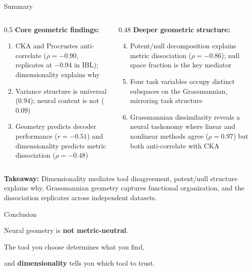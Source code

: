 \documentclass[aspectratio=169,11pt]{beamer}
\begin{document}
\begin{frame}{Summary}
\begin{columns}[T]
\begin{column}{0.5\textwidth}
\textbf{Core geometric findings:}
\begin{enumerate}
  \item CKA and Procrustes anti-correlate ($\rho = -0.90$, replicates at $-0.94$ in IBL); dimensionality explains why
  \item Variance structure is universal ($0.94$); neural content is not ($0.09$)
  \item Geometry predicts decoder performance ($r = -0.51$) and dimensionality predicts metric dissociation ($\rho = -0.48$)
\end{enumerate}
\end{column}
\begin{column}{0.48\textwidth}
\textbf{Deeper geometric structure:}
\begin{enumerate}
  \setcounter{enumi}{3}
  \item Potent/null decomposition explains metric dissociation ($\rho = -0.86$); null space fraction is the key mediator
  \item Four task variables occupy distinct subspaces on the Grassmannian, mirroring task structure
  \item Grassmannian dissimilarity reveals a neural taskonomy where linear and nonlinear methods agree ($\rho = 0.97$) but both anti-correlate with CKA
\end{enumerate}
\end{column}
\end{columns}

\vspace{0.5em}
{\small \textbf{Takeaway:} Dimensionality mediates tool disagreement, potent/null structure explains why, Grassmannian geometry captures functional organization, and the dissociation replicates across independent datasets.}
\end{frame}

\begin{frame}{Conclusion}

\begin{center}
\vspace{0.5em}
{\Large Neural geometry is \textbf{not metric-neutral}.}

\vspace{0.6em}

{\Large The tool you choose determines what you find,}

\vspace{0.2em}

{\Large and \textbf{dimensionality} tells you which tool to trust.}
\end{center}
\end{frame}
\end{document}
